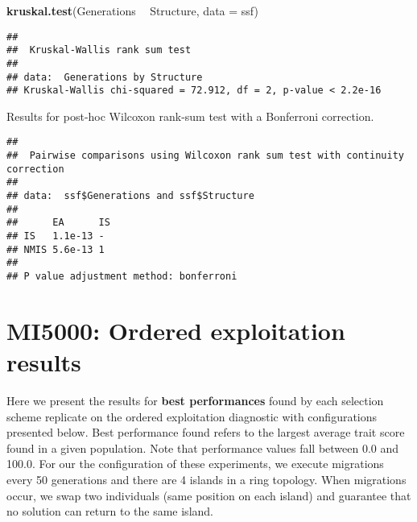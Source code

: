 \documentclass[]{book}
\newenvironment{Shaded}{\begin{snugshade}}{\end{snugshade}}
\newcommand{\DataTypeTok}[1]{\textcolor[rgb]{0.13,0.29,0.53}{#1}}
\newcommand{\KeywordTok}[1]{\textcolor[rgb]{0.13,0.29,0.53}{\textbf{#1}}}
\newcommand{\NormalTok}[1]{#1}
\newcommand{\OperatorTok}[1]{\textcolor[rgb]{0.81,0.36,0.00}{\textbf{#1}}}
\newcommand{\OtherTok}[1]{\textcolor[rgb]{0.56,0.35,0.01}{#1}}
\newcommand{\StringTok}[1]{\textcolor[rgb]{0.31,0.60,0.02}{#1}}
\begin{document}
\begin{Shaded}
\begin{Highlighting}[]
\KeywordTok{kruskal.test}\NormalTok{(Generations }\OperatorTok{~}\StringTok{ }\NormalTok{Structure, }\DataTypeTok{data =}\NormalTok{ ssf)}
\end{Highlighting}
\end{Shaded}

\begin{verbatim}
## 
##  Kruskal-Wallis rank sum test
## 
## data:  Generations by Structure
## Kruskal-Wallis chi-squared = 72.912, df = 2, p-value < 2.2e-16
\end{verbatim}

Results for post-hoc Wilcoxon rank-sum test with a Bonferroni correction.

\begin{Shaded}
\end{Shaded}

\begin{verbatim}
## 
##  Pairwise comparisons using Wilcoxon rank sum test with continuity correction 
## 
## data:  ssf$Generations and ssf$Structure 
## 
##      EA      IS
## IS   1.1e-13 - 
## NMIS 5.6e-13 1 
## 
## P value adjustment method: bonferroni
\end{verbatim}

\hypertarget{mi5000-ordered-exploitation-results}{%
\chapter{MI5000: Ordered exploitation results}\label{mi5000-ordered-exploitation-results}}

Here we present the results for \textbf{best performances} found by each selection scheme replicate on the ordered exploitation diagnostic with configurations presented below.
Best performance found refers to the largest average trait score found in a given population.
Note that performance values fall between 0.0 and 100.0.
For our the configuration of these experiments, we execute migrations every 50 generations and there are 4 islands in a ring topology.
When migrations occur, we swap two individuals (same position on each island) and guarantee that no solution can return to the same island.
\end{document}
